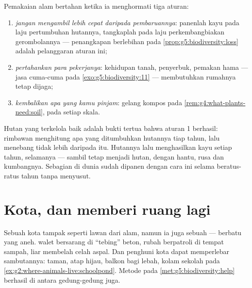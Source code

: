\begin{proposition}\label{prop:g5:people-and-nature:lasting}
Pemakaian alam bertahan ketika ia menghormati tiga aturan:
\begin{enumerate}
  \item \emph{jangan mengambil lebih cepat daripada pembaruannya}:
        panenlah kayu pada laju pertumbuhan hutannya, tangkaplah 
        pada laju perkembangbiakan gerombolannya --- penangkapan 
        berlebihan pada \cref{prop:g5:biodiversity:loss} adalah
        pelanggaran aturan ini;
  \item \emph{pertahankan para pekerjanya}: kehidupan tanah,
        penyerbuk, pemakan hama --- jasa cuma-cuma pada
        \cref{exo:g5:biodiversity:11} --- membutuhkan rumahnya tetap
        dijaga;
  \item \emph{kembalikan apa yang kamu pinjam}: gelang kompos pada
        \cref{rem:g4:what-plants-need:soil}, pada setiap skala.
\end{enumerate}
\end{proposition}
\admitted

\begin{example}\label{ex:g5:people-and-nature:forester}
Hutan yang terkelola baik adalah bukti tertua bahwa aturan 1 berhasil:
rimbawan menghitung apa yang ditumbuhkan hutannya tiap tahun, lalu
menebang tidak lebih daripada itu. Hutannya lalu menghasilkan kayu
setiap tahun, selamanya --- sambil tetap menjadi hutan, dengan 
hantu, rusa dan kumbangnya. Sebagian  di dunia sudah
dipanen dengan cara ini selama beratus-ratus tahun tanpa menyusut.
\end{example}

\section{Kota, dan memberi ruang lagi}

\begin{example}\label{ex:g5:people-and-nature:city}
Sebuah kota tampak seperti lawan dari alam, namun ia juga sebuah
 ---  berbatu yang aneh.  walet bersarang di
``tebing'' beton, rubah berpatroli di tempat sampah,  liar
membelah celah aspal. Dan penghuni kota dapat memperlebar
sambutannya: taman, atap hijau,  balkon bagi lebah, kolam sekolah
pada \cref{ex:g2:where-animals-live:schoolpond}. Metode pada
\cref{met:g5:biodiversity:help} berhasil di antara gedung-gedung juga.
\end{example}

